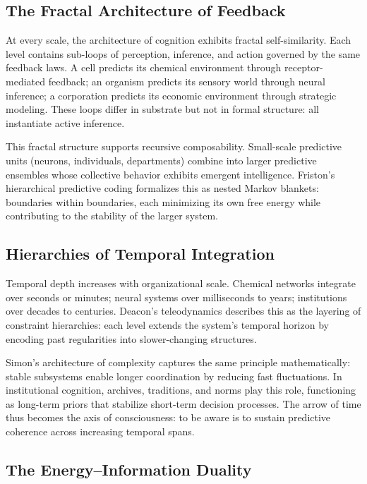 \documentclass[11pt,a4paper]{article}
\begin{document}
\subsection{The Fractal Architecture of Feedback}

At every scale, the architecture of cognition exhibits fractal self-similarity.  Each level contains sub-loops of perception, inference, and action governed by the same feedback laws.  A cell predicts its chemical environment through receptor-mediated feedback; an organism predicts its sensory world through neural inference; a corporation predicts its economic environment through strategic modeling.  These loops differ in substrate but not in formal structure: all instantiate active inference.

This fractal structure supports recursive composability.  Small-scale predictive units (neurons, individuals, departments) combine into larger predictive ensembles whose collective behavior exhibits emergent intelligence.  Friston’s hierarchical predictive coding \citep{Friston2010FreeEnergyPrinciple} formalizes this as nested Markov blankets: boundaries within boundaries, each minimizing its own free energy while contributing to the stability of the larger system.

\subsection{Hierarchies of Temporal Integration}

Temporal depth increases with organizational scale.  Chemical networks integrate over seconds or minutes; neural systems over milliseconds to years; institutions over decades to centuries.  Deacon’s teleodynamics \citep{Deacon2011IncompleteNature} describes this as the layering of constraint hierarchies: each level extends the system’s temporal horizon by encoding past regularities into slower-changing structures.

Simon’s architecture of complexity \citep{Simon1962ArchitectureComplexity} captures the same principle mathematically: stable subsystems enable longer coordination by reducing fast fluctuations.  In institutional cognition, archives, traditions, and norms play this role, functioning as long-term priors that stabilize short-term decision processes.  The arrow of time thus becomes the axis of consciousness: to be aware is to sustain predictive coherence across increasing temporal spans.

\subsection{The Energy–Information Duality}
\end{document}
